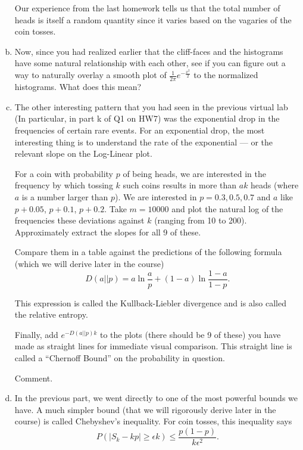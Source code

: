 \documentclass[]{article}
\begin{document}
\begin{qunlist}
\begin{enumerate}[a)]
 Our experience from the last homework tells us that the total number
 of heads is itself a random quantity since it varies based on the
 vagaries of the coin tosses.


\qpart 
\item Now, since you had realized earlier that the cliff-faces and the
  histograms have some natural relationship with each other, see if
  you can figure out a way to naturally overlay a smooth plot of
  $\frac{1}{2\pi} e^{-\frac{x^2}{2}}$ to the normalized
  histograms. What does this mean?

\qpart
\item The other interesting pattern that you had seen in the previous
  virtual lab (In particular, in part k of Q1 on HW7) was the
  exponential drop in the frequencies of certain rare events. For an
  exponential drop, the most interesting thing is to understand the
  rate of the exponential --- or the relevant slope on the Log-Linear
  plot.  

  For a coin with probability $p$ of being heads, we are interested in
  the frequency by which tossing $k$ such coins results in more than
  $ak$ heads (where $a$ is a number larger than $p$). We are
  interested in $p=0.3,0.5,0.7$ and $a$ like $p+0.05$,
  $p+0.1$, $p+0.2$.  Take $m = 10000$ and plot the natural log of the frequencies 
  these deviations against $k$ (ranging from 10 to 200). Approximately
  extract the slopes for all 9 of these.

  Compare them in a table against the predictions of the following
  formula (which we will derive later in the course)
  $$D(a||p) = a \ln \frac{a}{p} + (1-a) \ln \frac{1-a}{1-p}.$$
  
  This expression is called the Kullback-Liebler divergence and is also
  called the relative entropy. 

  Finally, add $e^{-D(a||p) k}$ to the plots (there should be 9 of
  these) you have made as straight lines for immediate visual
  comparison. This straight line is called a ``Chernoff Bound'' on the
  probability in question. 

  Comment. 

\qpart
\item In the previous part, we went directly to one of the most
  powerful bounds we have. A much simpler bound (that we will
  rigorously derive later in the course) is called Chebyshev's
  inequality. For coin tosses, this inequality says 
$$P(|S_k - k p| \geq \epsilon k) \leq \frac{ p (1-p)}{k \epsilon^2}.$$ 


\end{enumerate}
\end{qunlist}
\end{document}
